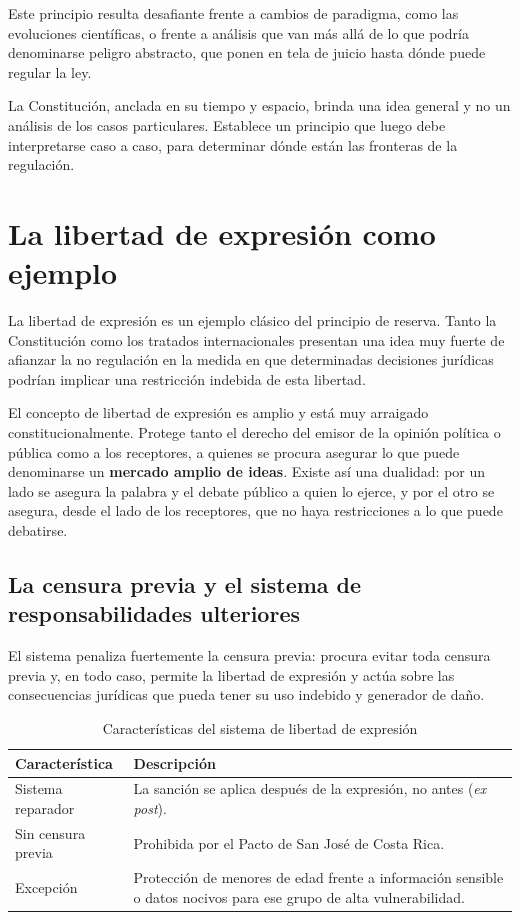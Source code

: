 \documentclass[12pt,oneside]{book}
\begin{document}
Este principio resulta desafiante frente a cambios de paradigma, como las evoluciones científicas, o frente a análisis que van más allá de lo que podría denominarse peligro abstracto, que ponen en tela de juicio hasta dónde puede regular la ley.

\begin{note}
La Constitución, anclada en su tiempo y espacio, brinda una idea general y no un análisis de los casos particulares. Establece un principio que luego debe interpretarse caso a caso, para determinar dónde están las fronteras de la regulación.
\end{note}

\section{La libertad de expresión como ejemplo}

La libertad de expresión es un ejemplo clásico del principio de reserva. Tanto la Constitución como los tratados internacionales presentan una idea muy fuerte de afianzar la no regulación en la medida en que determinadas decisiones jurídicas podrían implicar una restricción indebida de esta libertad.

El concepto de libertad de expresión es amplio y está muy arraigado constitucionalmente. Protege tanto el derecho del emisor de la opinión política o pública como a los receptores, a quienes se procura asegurar lo que puede denominarse un \textbf{mercado amplio de ideas}. Existe así una dualidad: por un lado se asegura la palabra y el debate público a quien lo ejerce, y por el otro se asegura, desde el lado de los receptores, que no haya restricciones a lo que puede debatirse.

\subsection{La censura previa y el sistema de responsabilidades ulteriores}

El sistema penaliza fuertemente la censura previa: procura evitar toda censura previa y, en todo caso, permite la libertad de expresión y actúa sobre las consecuencias jurídicas que pueda tener su uso indebido y generador de daño.

\begin{table}[H]
\centering
\caption{Características del sistema de libertad de expresión}
\begin{tabularx}{\textwidth}{Q{0.28\textwidth}Y}
\toprule
\textbf{Característica} & \textbf{Descripción} \\
\midrule
Sistema reparador & La sanción se aplica después de la expresión, no antes (\textit{ex post}). \\
\addlinespace
Sin censura previa & Prohibida por el Pacto de San José de Costa Rica. \\
\addlinespace
Excepción & Protección de menores de edad frente a información sensible o datos nocivos para ese grupo de alta vulnerabilidad. \\
\bottomrule
\end{tabularx}
\end{table}
\end{document}
